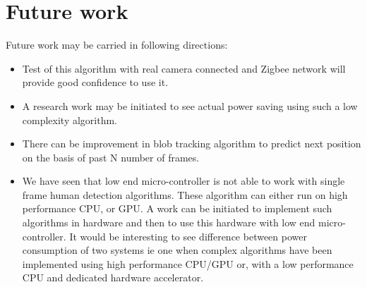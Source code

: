 \section{Future work}
Future work may be carried in following directions:
\begin{itemize}
\item Test of this algorithm with real camera connected and Zigbee
network will provide good confidence to use it.
\item A research work may be initiated to see actual power saving using
such a low complexity algorithm.
\item There can be improvement in blob tracking algorithm to predict
next position on the basis of past N number of frames.
\item We have seen that low end micro-controller is not able to work with
single frame human detection algorithms. These algorithm can either run on
high performance CPU, or GPU. A work can be initiated to implement such
algorithms in hardware and then to use this hardware with low end
micro-controller. It would be interesting to see difference between power
consumption of two systems ie one when complex algorithms have been
implemented using high performance CPU/GPU or, with a low performance
CPU and dedicated hardware accelerator.
\end{itemize}

